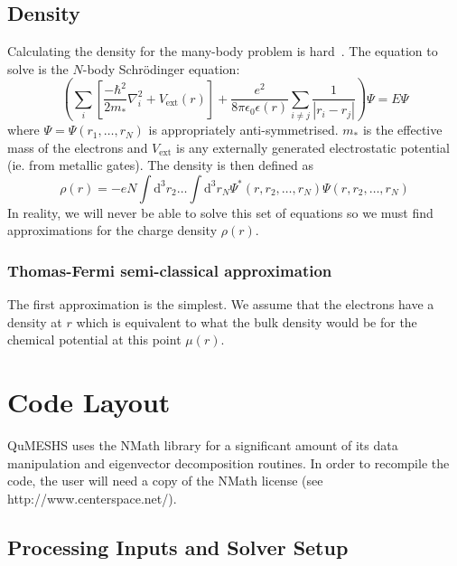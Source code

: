 \documentclass[12pt]{article}
\newcommand{\dd}{\text{d}}
\begin{document}
\subsection{Density}

Calculating the density for the many-body problem is hard~\cite{:-P}.  The equation
to solve is the $N$-body Schr\"{o}dinger equation:
%
\begin{equation}
    \left( \sum_i \left[ \frac{-\hbar^2}{2 m_*} \nabla^2_i + V_{\mathrm{ext}} (r)\right] + \frac{e^2}{8 \pi \epsilon_0 \epsilon (r)} \sum_{i \neq j} \frac{1}{|r_i - r_j|} \right) \Psi = E \Psi
\end{equation}
%
where $\Psi = \Psi (r_1, \ldots, r_N)$ is appropriately anti-symmetrised.  $m_*$
is the effective mass of the electrons and $V_{\mathrm{ext}}$ is any externally
generated electrostatic potential (ie. from metallic gates).  The density is then
defined as
%
\begin{equation}
    \rho (r) = -e N \int \dd^3 r_2 \ldots \int \dd^3 r_N \Psi^* (r, r_2, \ldots, r_N) \Psi(r, r_2, \ldots, r_N)
\end{equation}
%
In reality, we will never be able to solve this set of equations so we must find
approximations for the charge density $\rho (r)$.

\subsubsection{Thomas-Fermi semi-classical approximation}

The first approximation is the simplest.  We assume that the electrons have a density
at $r$ which is equivalent to what the bulk density would be for the chemical potential
at this point $\mu (r)$.



\section{Code Layout}

QuMESHS uses the NMath library for a significant amount of its data manipulation and
eigenvector decomposition routines.  In order to recompile the code, the user will need
a copy of the NMath license (see http://www.centerspace.net/).


\subsection{Processing Inputs and Solver Setup}
\end{document}
